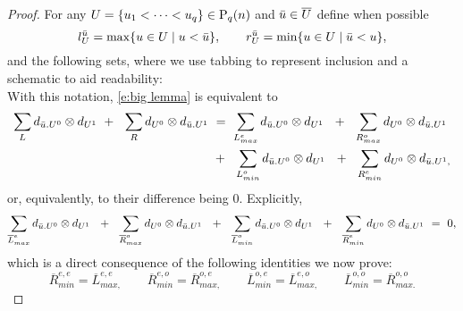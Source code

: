 \begin{proof}
	For any $U = \{u_1 < \cdots < u_q\} \in \P_{q}(n)$ and $\bu \in \overline{U}$ define when possible
	\begin{equation*}
	l_U^\bu = \max \{u \in U \mid u < \bu\}, \qquad
	r_U^\bu = \min\{u \in U \mid \bu < u\},
	\end{equation*}
	and the following sets, where we use tabbing to represent inclusion and a schematic to aid readability:\\

	

	With this notation, \eqref{e:big lemma} is equivalent to
	\begin{align*}
	\sum_{L} d_{\bu.U^0} \ot d_{U^1}\ +\ \
	\sum_{R} d_{U^0} \ot d_{\bu.U^1} \ & = \
	\sum_{{L}_{max}^{e}} d_{\bu.U^0} \ot d_{U^1}\ \ +\ \
	\sum_{{R}_{max}^{o}} d_{U^0} \ot d_{\bu.U^1}\ \\ \ & +\ \
	\sum_{{L}_{min}^{o}} d_{\bu.U^0} \ot d_{U^1}\ \ +\ \
	\sum_{{R}_{min}^{e}} d_{U^0} \ot d_{\bu.U^1,}
	\end{align*}
	or, equivalently, to their difference being $0$.
	Explicitly,
	\begin{equation*}
	\sum_{\overline{L}_{max}^{e}} d_{\bu.U^0} \ot d_{U^1}\ \ +\ \
	\sum_{\overline{R}_{max}^{o}} d_{U^0} \ot d_{\bu.U^1}\ \ +\ \
	\sum_{\overline{L}_{min}^{o}} d_{\bu.U^0} \ot d_{U^1}\ \ +\ \
	\sum_{\overline{R}_{min}^{e}} d_{U^0} \ot d_{\bu.U^1} \ = \ 0,
	\end{equation*}
	which is a direct consequence of the following identities we now prove:
	\begin{equation} \label{e:big lemma four identities}
	\overline{R}_{min}^{e,e} = \overline{L}_{max,}^{e,e} \qquad
	\overline{R}_{min}^{e,o} = \overline{R}_{max,}^{o,e} \qquad
	\overline{L}_{min}^{o,e} = \overline{L}_{max,}^{e,o} \qquad
	\overline{L}_{min}^{o,o} = \overline{R}_{max.}^{o,o}
	\end{equation}


\end{proof}
